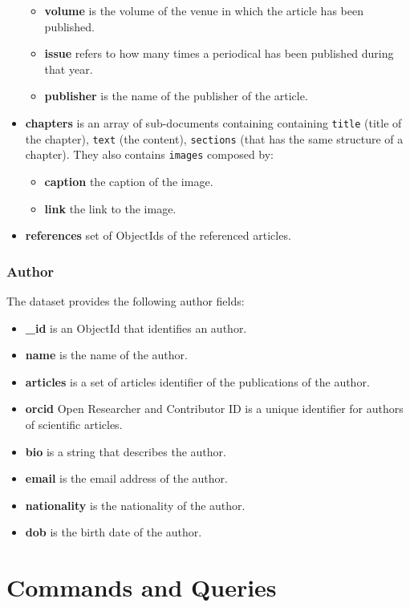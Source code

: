 \documentclass{Configuration_Files/PoliMi3i_thesis}
\begin{document}
\begin{itemize}
\begin{itemize}
					\item \textbf{volume} is the volume of the venue in which the article has been published.
					\item \textbf{issue} refers to how many times a periodical has been published during that year.
					\item \textbf{publisher} is the name of the publisher of the article.
				\end{itemize}
\item \textbf{chapters} is an array of sub-documents containing containing \verb |title| (title of the chapter), \verb |text| (the content),
	 \verb |sections| (that has the same structure of a chapter). They also contains \verb |images| composed by:
				\begin{itemize}
					\item \textbf{caption} the caption of the image.
					\item \textbf{link} the link to the image.
				\end{itemize}
\item \textbf{references} set of ObjectIds of the referenced articles.
\end{itemize}
\bigskip

\subsection{Author}
The dataset provides the following author fields:
\begin{itemize}
\item \textbf{\_id} is an ObjectId that identifies an author.
\item \textbf{name} is the name of the author.
\item \textbf{articles} is a set of articles identifier of the publications of the author.
\item \textbf{orcid} Open Researcher and Contributor ID is a unique identifier for authors of scientific articles.
\item \textbf{bio} is a string that describes the author.
\item \textbf{email} is the email address of the author.
\item \textbf{nationality} is the nationality of the author.
\item \textbf{dob} is the birth date of the author.
\end{itemize}


\chapter{Commands and Queries}
\label{ch:ceq}
\end{document}

